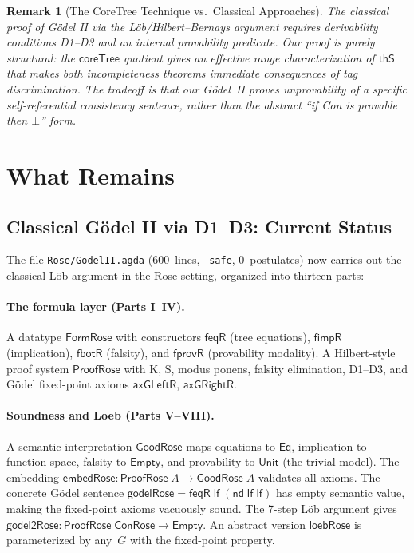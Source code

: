 \documentclass[11pt]{article}
\newtheorem{remark}[theorem]{Remark}
\newcommand{\lf}{\mathsf{lf}}
\newcommand{\nd}{\mathsf{nd}}
\newcommand{\thS}{\mathsf{thS}}
\newcommand{\Eq}{\mathsf{Eq}}
\newcommand{\coreTree}{\mathsf{coreTree}}
\begin{document}
\begin{remark}[The CoreTree Technique vs.\ Classical Approaches]
The classical proof of G\"odel II via the L\"ob/Hilbert--Bernays argument
requires derivability conditions D1--D3 and an internal provability predicate.
Our proof is purely \emph{structural}: the $\coreTree$ quotient gives an effective
range characterization of $\thS$ that makes both incompleteness theorems
immediate consequences of tag discrimination. The tradeoff is that our G\"odel~II
proves unprovability of a specific self-referential consistency sentence, rather
than the abstract ``if Con is provable then $\bot$'' form.
\end{remark}

\section{What Remains}

\subsection{Classical G\"odel II via D1--D3: Current Status}

The file \texttt{Rose/GodelII.agda} (600~lines, \texttt{--safe}, 0~postulates)
now carries out the classical L\"ob argument in the Rose setting, organized into
thirteen parts:

\paragraph{The formula layer (Parts I--IV).}
A datatype $\mathsf{FormRose}$ with constructors $\mathsf{feqR}$ (tree equations),
$\mathsf{fimpR}$ (implication), $\mathsf{fbotR}$ (falsity), and
$\mathsf{fprovR}$ (provability modality). A Hilbert-style proof system
$\mathsf{ProofRose}$ with K, S, modus ponens, falsity elimination, D1--D3,
and G\"odel fixed-point axioms $\mathsf{axGLeftR}$, $\mathsf{axGRightR}$.

\paragraph{Soundness and Loeb (Parts V--VIII).}
A semantic interpretation $\mathsf{GoodRose}$ maps equations to $\Eq$, implication
to function space, falsity to $\mathsf{Empty}$, and provability to $\mathsf{Unit}$
(the trivial model). The embedding $\mathsf{embedRose} : \mathsf{ProofRose}\;A
\to \mathsf{GoodRose}\;A$ validates all axioms. The concrete G\"odel sentence
$\mathsf{godelRose} = \mathsf{feqR}\;\lf\;(\nd\;\lf\;\lf)$ has empty semantic
value, making the fixed-point axioms vacuously sound. The 7-step L\"ob argument
gives $\mathsf{godel2Rose} : \mathsf{ProofRose}\;\mathsf{ConRose} \to \mathsf{Empty}$.
An abstract version $\mathsf{loebRose}$ is parameterized by any~$G$ with the
fixed-point property.
\end{document}
